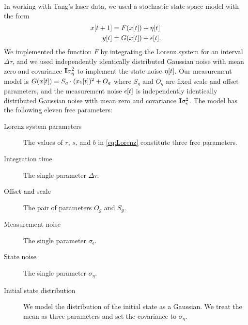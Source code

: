 In working with Tang's laser data, we used a stochastic state space
model with the form
\begin{subequations}
  \label{eq:FandG}
  \begin{align}
    {x}{[t+1]} &= F({x}{[t]}) + {\eta}{[t]}\\
    {y}{[t]}   &= G({x}{[t]}) + {\epsilon}{[t]}.
  \end{align}
\end{subequations}
We implemented the function $F$ by integrating the Lorenz system for
an interval $\Delta \tau$, and we used independently identically
distributed Gaussian noise with mean zero and covariance
${\bf I}\sigma_\eta^2$ to implement the state noise ${\eta}{[t]}$.
  Our measurement model is $G({x}{[t]}) = S_g \cdot
({x_1}{[t]})^2 + O_g$ where $S_g$ and $O_g$ are fixed scale and
offset parameters, and the measurement noise ${\epsilon}{[t]}$ is
independently identically distributed Gaussian noise with mean zero
and covariance ${\bf I}\sigma_\epsilon^2$.  The model has the following
eleven free parameters: \label{page:eleven_parameters}
\begin{description}
\item[Lorenz system parameters] The values of $r$, $s$, and $b$ in
  \eqref{eq:Lorenz} constitute three free parameters.
\item[Integration time] The single parameter $\Delta \tau$.
\item[Offset and scale] The pair of parameters $O_g$ and $S_g$.
\item[Measurement noise] The single parameter $\sigma_\epsilon$.
\item[State noise] The single parameter $\sigma_\eta$.
\item[Initial state distribution] We model the distribution of the
  initial state as a Gaussian.  We treat the mean as three
  parameters and set the covariance to $\sigma_\eta$.
\end{description}


